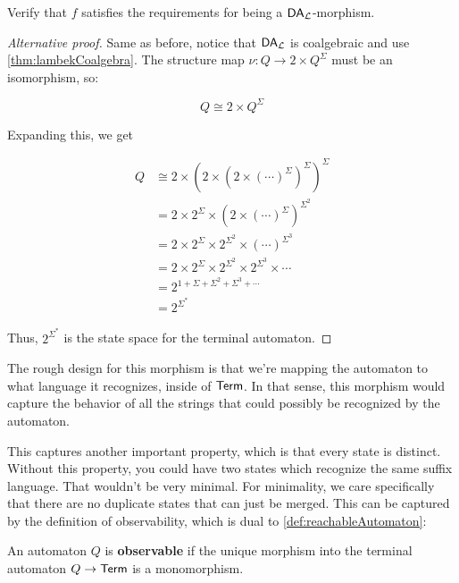 \begin{refinementexercise}
    Verify that $f$ satisfies the requirements for being a $\mathsf{DA}_\mathcal L$-morphism.
\end{refinementexercise}

\begin{proof}[Alternative proof]
  Same as before, notice that $\mathsf{DA}_\mathcal L$ is coalgebraic and use \cref{thm:lambekCoalgebra}.
  The structure map $\nu : Q \rightarrow 2 \times Q^\Sigma$ must be an isomorphism, so:

  \begin{equation}
    Q \cong 2 \times Q^\Sigma
  \end{equation}

Expanding this, we get 

\begin{align*}
  Q &\cong 2 \times \left(2 \times \left(2 \times (\cdots)^\Sigma\right)^\Sigma\right)^\Sigma \\
  &= 2 \times 2^\Sigma \times (2 \times (\cdots)^\Sigma)^{\Sigma^2} \\
  &= 2 \times 2^\Sigma \times 2^{\Sigma^2} \times (\cdots)^{\Sigma^3} \\
  &= 2 \times 2^\Sigma \times 2^{\Sigma^2} \times 2^{\Sigma^3} \times \cdots \\
  &= 2^{1 + \Sigma + \Sigma^2 + \Sigma^3 + \cdots} \\
  &= 2^{\Sigma^*}
\end{align*}

  Thus, $2^{\Sigma^*}$ is the state space for the terminal automaton.
\end{proof}

The rough design for this morphism is that we're mapping the automaton to what language it recognizes, inside of $\mathsf{Term}$.
In that sense, this morphism would capture the behavior of all the strings that could possibly be recognized by the automaton.

This captures another important property, which is that every state is distinct.
Without this property, you could have two states which recognize the same suffix language.
That wouldn't be very minimal.
For minimality, we care specifically that there are no duplicate states that can just be merged.
This can be captured by the definition of observability, which is dual to \cref{def:reachableAutomaton}:

\begin{definition}
    \label{def:observableAutomaton}
  An automaton $Q$ is \textbf{observable} if the unique morphism into the terminal automaton $Q \rightarrow \mathsf{Term}$ is a monomorphism.
\end{definition}

